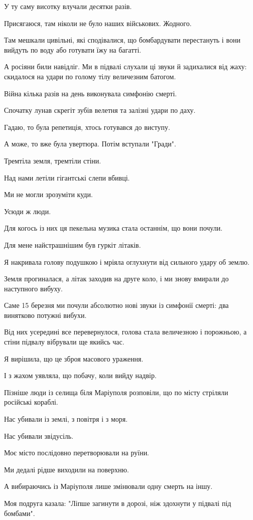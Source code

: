 У ту саму висотку влучали десятки разів. 

Присягаюся, там ніколи не було наших військових. Жодного. 

Там мешкали цивільні, які сподівалися, що бомбардувати перестануть і вони
вийдуть по воду або готувати їжу на багатті. 

А росіяни били навідліг. Ми в підвалі слухали ці звуки й задихалися від жаху:
скидалося на удари по голому тілу величезним батогом.

Війна кілька разів на день виконувала симфонію смерті.

Спочатку лунав скрегіт зубів велетня та залізні удари по даху.

Гадаю, то була репетиція, хтось готувався до виступу. 

А може, то вже була увертюра. Потім вступали "Гради". 

Тремтіла земля, тремтіли стіни.

Над нами летіли гігантські слепи  вбивці. 

Ми не могли зрозуміти куди.

Усюди ж люди. 

Для когось із них ця пекельна  музика стала останнім, що вони почули.

Для мене найстрашнішим був гуркіт літаків. 

Я накривала голову подушкою і мріяла оглухнути від сильного удару об землю. 

Земля прогиналася, а літак заходив на друге коло, і ми знову вмирали до
наступного вибуху.

Саме 15 березня ми почули абсолютно нові звуки із симфонії смерті: два
винятково потужні вибухи.

Від них усередині все перевернулося, голова стала величезною і порожньою, а
стіни підвалу вібрували ще якийсь час.

Я вирішила, що це зброя масового ураження. 

І з жахом уявляла, що побачу, коли вийду надвір.

Пізніше люди із селища біля Маріуполя розповіли, що по місту стріляли російські
кораблі. 

Нас убивали із землі, з повітря і з моря. 

Нас убивали звідусіль. 

Моє місто послідовно перетворювали на руїни.

Ми дедалі рідше виходили на поверхню. 

А вибираючись із Маріуполя лише змінювали одну смерть на іншу.

Моя подруга казала: "Ліпше загинути в дорозі, ніж здохнути у підвалі під
бомбами".
